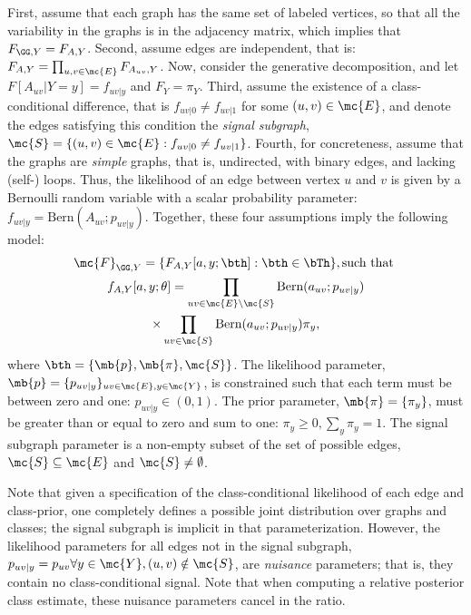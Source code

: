 \documentclass[10pt,journal,cspaper,compsoc]{IEEEtran}
\begin{document}
First,  assume that each graph has the same set of labeled vertices, so that all the variability in the graphs is in the adjacency matrix, which implies that $F_{\GG,Y}=F_{A,Y}$. Second, assume edges are independent, that is: $F_{A,Y}=\prod_{u,v \in \mc{E}} F_{A_{uv},Y}$.  Now, consider the generative decomposition, and let $F[A_{uv} | Y=y]=f_{uv|y}$ and $F_Y=\pi_Y$.  Third, assume the existence of a class-conditional difference, that is $f_{uv|0} \neq f_{uv|1}$ for some $(u,v) \in \mc{E}$, and denote the edges satisfying this condition  the \emph{signal subgraph}, $\mc{S}=\{(u,v) \in \mc{E}: f_{uv|0} \neq f_{uv|1}\}$.  Fourth, for concreteness, assume that the graphs are \emph{simple} graphs, that is, undirected, with binary edges, and lacking (self-) loops.  Thus, the likelihood of an edge between vertex $u$ and $v$ is given by a Bernoulli random variable with a scalar probability parameter:  $f_{uv|y}=\text{Bern}(A_{uv}; p_{uv|y})$. Together, these four assumptions imply the following model: 
\begin{multline}
\mc{F}_{\GG,Y}=\{F_{A, Y}[a,y; \bth]:   \bth \in \bTh\}, 
\text{such that } \\ f_{A,Y}[a,y; \theta]  =\prod_{uv \in \mc{E} \backslash \mc{S}} \text{Bern}(a_{uv}; p_{uv|y}) \\ \times \prod_{uv \in \mc{S}} \text{Bern}(a_{uv}; p_{uv|y})  \pi_y,
\end{multline}
where $\bth=\{\mb{p},\mb{\pi},\mc{S}\}$. The likelihood parameter, $\mb{p}=\{p_{uv|y}\}_{uv \in \mc{E}, y \in \mc{Y}}$, is constrained such that each term must be between zero and one: $p_{uv|y} \in (0,1)$.  The prior parameter, $\mb{\pi}=\{\pi_y\}$, must be greater than or equal to zero and sum to one: $\pi_y \geq 0, \sum_y \pi_y=1$.  The signal subgraph parameter is a non-empty subset of the set of possible edges, $\mc{S} \subseteq \mc{E}$ and $\mc{S} \neq \emptyset$.

Note that given a specification of the class-conditional likelihood of each edge and class-prior, one completely defines a possible joint distribution over graphs and classes; the signal subgraph is implicit in that parameterization. However, the likelihood parameters for all edges not in the signal subgraph, $p_{uv|y}=p_{uv} \forall y \in \mc{Y}, (u,v) \notin \mc{S}$,  are \emph{nuisance} parameters; that is, they contain no class-conditional signal.  Note that when computing a relative posterior class estimate, these nuisance parameters cancel in the ratio.
\end{document}
